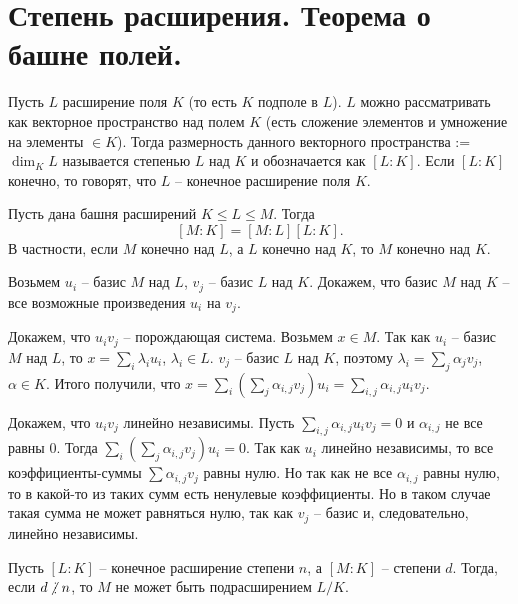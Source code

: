 \section{
 Степень расширения. Теорема о башне полей.
}

 Пусть $L$ расширение поля $K$ (то есть $K$ подполе в $L$). $L$ можно рассматривать как векторное пространство над полем $K$ 
(есть сложение элементов и умножение на элементы $\in K$). 
Тогда размерность данного векторного пространства := $\dim_K L$ называется степенью $L$ над $K$ и обозначается как $[L: K]$. Если $[L: K]$ конечно, то говорят, что $L$ -- конечное расширение поля $K$.
\edfn

 Пусть дана башня расширений $K\leq L \leq M$. Тогда 
$$[M: K]=[M: L][L: K].$$
В частности, если $M$ конечно над $L$, а $L$ конечно над $K$, то $M$ конечно над $K$.
\ethrm

\proof
Возьмем $u_i$ -- базис $M$ над $L$, $v_j$ -- базис $L$ над $K$.
Докажем, что базис $M$ над $K$ -- все возможные произведения $u_i$ на $v_j$.

Докажем, что $u_i v_j$ -- порождающая система.
Возьмем $x \in M$. Так как $u_i$ -- базис $M$ над $L$, то $x = \sum_{i} \lambda_i u_i$, $\lambda_i \in L$. 
$v_j$ -- базис $L$ над $K$, поэтому $\lambda_i = \sum_j \alpha_j v_j$, $\alpha \in K$. Итого получили, что 
$x = \sum_{i} (\sum_j \alpha_{i,j} v_j) u_i = \sum_{i,j} \alpha_{i,j} u_i v_j$. 

Докажем, что $u_i v_j$ линейно независимы.
Пусть $\sum_{i,j} \alpha_{i,j} u_i v_j = 0$ и $\alpha_{i,j}$ не все равны 0. Тогда 
$\sum_i (\sum_j \alpha_{i,j} v_j) u_i = 0$. Так как $u_i$ линейно независимы, то все коэффициенты-суммы $\sum \alpha_{i,j} v_j$ равны нулю.
Но так как не все $\alpha_{i,j}$ равны нулю, то в какой-то из таких сумм есть ненулевые коэффициенты. Но
в таком случае такая сумма не может равняться нулю, так как $v_j$ -- базис и, следовательно, линейно независимы.

\endproof

\crl Пусть $[L: K]$ -- конечное расширение степени $n$, а $[M:K]$ -- степени $d$. Тогда, если $d \ndi n$, то $M$ не может быть подрасширением $L/K$.
\ecrl

